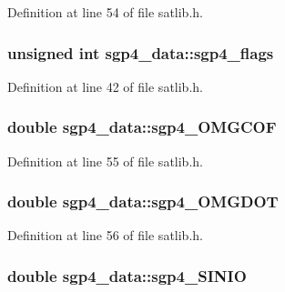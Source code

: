 Definition at line 54 of file satlib.\-h.

\hypertarget{structsgp4__data_ad2c653bf404da1f8cd71b1570435c988}{
\subsubsection[{sgp4\-\_\-flags}]{\setlength{\rightskip}{0pt plus 5cm}unsigned int sgp4\-\_\-data\-::sgp4\-\_\-flags}}\label{structsgp4__data_ad2c653bf404da1f8cd71b1570435c988}


Definition at line 42 of file satlib.\-h.

\hypertarget{structsgp4__data_a547296bc502e383ce1141540bf4e384e}{
\subsubsection[{sgp4\-\_\-\-O\-M\-G\-C\-O\-F}]{\setlength{\rightskip}{0pt plus 5cm}double sgp4\-\_\-data\-::sgp4\-\_\-\-O\-M\-G\-C\-O\-F}}\label{structsgp4__data_a547296bc502e383ce1141540bf4e384e}


Definition at line 55 of file satlib.\-h.

\hypertarget{structsgp4__data_aaf1896c52cd17ee52c5c78709b98a063}{
\subsubsection[{sgp4\-\_\-\-O\-M\-G\-D\-O\-T}]{\setlength{\rightskip}{0pt plus 5cm}double sgp4\-\_\-data\-::sgp4\-\_\-\-O\-M\-G\-D\-O\-T}}\label{structsgp4__data_aaf1896c52cd17ee52c5c78709b98a063}


Definition at line 56 of file satlib.\-h.

\hypertarget{structsgp4__data_ad05b71a577cb5e1131329a2c2bae5bd7}{
\subsubsection[{sgp4\-\_\-\-S\-I\-N\-I\-O}]{\setlength{\rightskip}{0pt plus 5cm}double sgp4\-\_\-data\-::sgp4\-\_\-\-S\-I\-N\-I\-O}}\label{structsgp4__data_ad05b71a577cb5e1131329a2c2bae5bd7}


